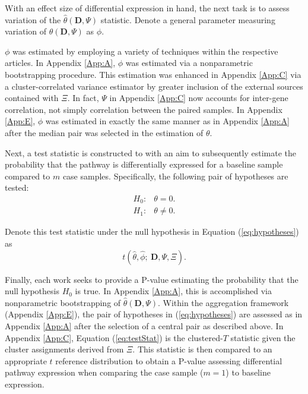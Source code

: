 With an effect size of differential expression in hand, the next task is to assess variation of the $\hat{\theta}(\mathbf{D}, \Psi)$ statistic. Denote a general parameter measuring variation of $\hat{\theta}(\mathbf{D}, \Psi)$ as $\phi$.


$\phi$ was estimated by employing a variety of techniques within the respective articles. In Appendix \ref{App:A}, $\phi$ was estimated via a nonparametric bootstrapping procedure. This estimation was enhanced in Appendix \ref{App:C} via a cluster-correlated variance estimator by greater inclusion of the external sources contained with $\Xi$. In fact, $\Psi$ in Appendix \ref{App:C} now accounts for inter-gene correlation, not simply correlation between the paired samples. In Appendix \ref{App:E}, $\phi$ was estimated in exactly the same manner as in Appendix \ref{App:A} after the median pair was selected in the estimation of $\theta$.

Next, a test statistic is constructed to with an aim to subsequently estimate the probability that the pathway is differentially expressed for a baseline sample compared to $m$ case samples. Specifically, the following pair of hypotheses are tested:
\begin{equation}
  \label{eq:hypotheses}
\begin{array}{rl} \tag{2}
  H_{0}: & \theta = 0. \\
  H_{1}: & \theta \neq 0.
\end{array}
\end{equation}

\noindent \noindent Denote this test statistic under the null hypothesis in Equation (\ref{eq:hypotheses}) as
\begin{equation}
\label{eq:testStat}
t(\hat{\theta},\hat{\phi};~\mathbf{D},\Psi,\Xi). \tag{3}
\end{equation}

Finally, each work seeks to provide a P-value estimating the probability that the null hypothesis $H_{0}$ is true. In Appendix \ref{App:A}, this is accomplished via nonparametric bootstrapping of $\hat{\theta}(\mathbf{D}, \Psi)$. Within the aggregation framework (Appendix \ref{App:E}), the pair of hypotheses in (\ref{eq:hypotheses}) are assessed as in Appendix \ref{App:A} after the selection of a central pair as described above. In Appendix \ref{App:C}, Equation (\ref{eq:testStat}) is the clustered-$T$ statistic given the cluster assignments derived from $\Xi$. This statistic is then compared to an appropriate $t$ reference distribution to obtain a P-value assessing differential pathway expression when comparing the case sample ($m=1$) to baseline expression. 

